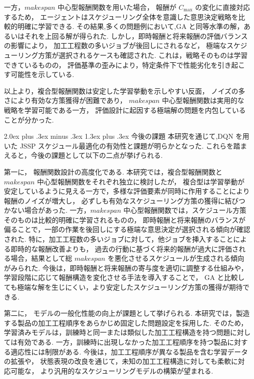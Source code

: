 \documentclass{jarticle}
\makeatletter
\renewcommand{\section}{%
  \@startsection{section}{1}{\z@}%
  {2.0ex plus .3ex minus .3ex}%
  {1.3ex plus .3ex}%
  {\huge\bfseries}%
}
\makeatother
\begin{document}
一方，$makespan$ 中心型報酬関数を用いた場合，
報酬が $C_{\max}$ の変化に直接対応するため，
エージェントはスケジューリング全体を意識した意思決定戦略を比較的明確に学習できる.
その結果,多くの問題例において,GA と同等水準の解，あるいはそれを上回る解が得られた.
しかし，即時報酬と将来報酬の評価バランスの影響により，
加工工程数の多いジョブが後回しにされるなど，
極端なスケジューリング方策が選択されるケースも確認された.
これは，戦略そのものは学習できているものの，
評価基準の歪みにより，特定条件下で性能劣化を引き起こす可能性を示している.

以上より，複合型報酬関数は安定した学習挙動を示しやすい反面，
ノイズの多さにより有効な方策獲得が困難であり，
$makespan$ 中心型報酬関数は実用的な戦略を学習可能である一方，
評価設計に起因する極端解の問題を内包していることが分かった.
\clearpage

\section{今後の課題}
本研究を通じて,DQN を用いた JSSP スケジュール最適化の有効性と課題が明らかとなった.
これらを踏まえると，今後の課題として以下の二点が挙げられる.

第一に，
報酬関数設計の高度化である.
本研究では，複合型報酬関数と $makespan$ 中心型報酬関数をそれぞれ独立に検討したが，
複合型は学習挙動が安定しているように見える一方で，多様な評価要素が同時に作用することにより報酬のノイズが増大し，
必ずしも有効なスケジューリング方策の獲得に結びつかない場合があった.
一方，$makespan$ 中心型報酬関数では，スケジュール方策そのものは比較的明確に学習されるものの，
即時報酬と将来報酬のバランスが偏ることで，一部の作業を後回しにする極端な意思決定が選択される傾向が確認された.
特に，加工工程数の多いジョブに対して，他ジョブを挿入することによる即時的な報酬改善よりも，
過去の行動に基づく将来的報酬が過大に評価される場合，結果として総 $makespan$ を悪化させるスケジュールが生成される傾向がみられた.
今後は，即時報酬と将来報酬の寄与度を適切に調整する仕組みや，
学習段階に応じて報酬構造を変化させる手法を導入することで，
GA と比較しても極端な解を生じにくい，より安定したスケジューリング方策の獲得が期待できる.

第二に，
モデルの一般化性能の向上が課題として挙げられる.
本研究では，製造する製品の加工工程順序をあらかじめ固定した問題設定を採用した.
そのため，学習済みモデルは，訓練時と同一または類似した加工工程構造を持つ問題に対しては有効である.
一方，訓練時に出現しなかった加工工程順序を持つ製品に対する適応性には制限がある.
今後は，加工工程順序が異なる製品を含む学習データの拡張や，
状態表現の改良を通じて，未知の加工工程構造に対しても柔軟に対応可能な，
より汎用的なスケジューリングモデルの構築が望まれる.
\clearpage
\end{document}
